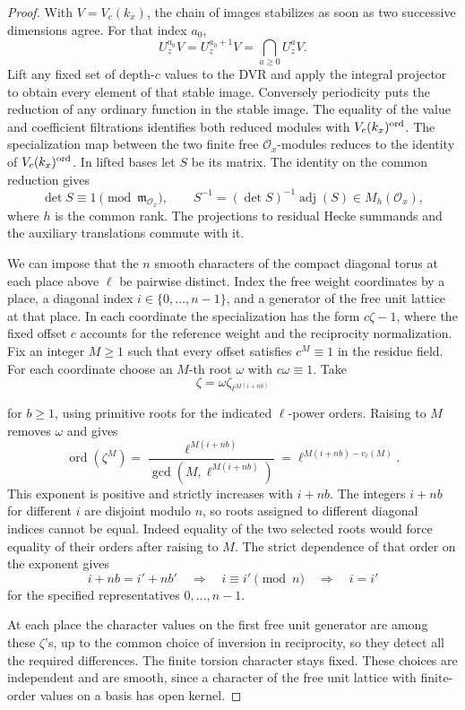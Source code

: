 \begin{proof}
With \(V=V_c(k_x)\), the chain of images stabilizes as soon as two successive dimensions agree. For that index \(a_0\),
\[
 U_z^{a_0}V=U_z^{a_0+1}V=\bigcap_{a\ge0}U_z^a V .
\] Lift any fixed set of depth-\(c\) values to the
DVR and apply the integral projector to obtain every element
of that stable image. Conversely periodicity puts the reduction
of any ordinary function in the stable image. The equality of
the value and coefficient filtrations identifies both reduced
modules with \(V_c(k_x)^{\rm ord}\). The specialization map between the two finite free
\(\mathcal O_x\)-modules reduces to the identity of
\(V_c(k_x)^{\rm ord}\). In lifted bases let \(S\) be its matrix. The identity on the common reduction gives
\[
 \det S\equiv1\pmod{\mathfrak m_{\mathcal O_x}},
 \qquad S^{-1}=(\det S)^{-1}\operatorname{adj}(S)\in M_h(\mathcal O_x),
\]
where \(h\) is the common rank. The projections to residual Hecke summands
and the auxiliary translations commute with it.

We can impose that the \(n\) smooth characters of
the compact diagonal torus at each place above
\(\ell\) be pairwise distinct. Index the free weight
coordinates by a place, a diagonal index
\(i\in\{0,\ldots,n-1\}\), and a generator of the free
unit lattice at that place. In each coordinate the
specialization has the form \(c\zeta-1\), where the
fixed offset \(c\) accounts for the reference weight
and the reciprocity normalization. Fix an integer
\(M\ge1\) such that every offset satisfies
\(c^M\equiv1\) in the residue field. For each coordinate
choose an \(M\)-th root \(\omega\) with
\(c\omega\equiv1\). Take
\[
 \zeta=\omega\zeta_{\ell^{M(i+nb)}}
\]

for \(b\ge1\), using primitive roots for the indicated
\(\ell\)-power orders. Raising to \(M\) removes \(\omega\) and gives
\[
 \operatorname{ord}(\zeta^M)
   =\frac{\ell^{M(i+nb)}}{\gcd(M,\ell^{M(i+nb)})}
   =\ell^{M(i+nb)-v_\ell(M)} .
\]
This exponent is positive and strictly increases with \(i+nb\).
The integers \(i+nb\) for different \(i\) are disjoint modulo
\(n\), so roots assigned to different diagonal indices cannot
be equal. Indeed equality of the two selected roots would force equality of their orders after raising to \(M\). The strict dependence of that order on the exponent gives
\[
 i+nb=i'+nb'\quad\Longrightarrow\quad i\equiv i'\pmod n
 \quad\Longrightarrow\quad i=i'
\]
for the specified representatives \(0,\ldots,n-1\).

At each place the character values on the
first free unit generator are among these \(\zeta\)'s,
up to the common choice of inversion in reciprocity, so
they detect all the required differences. The finite
torsion character stays fixed. These choices are independent
and are smooth, since a character of the free unit lattice
with finite-order values on a basis has open kernel.


\end{proof}
